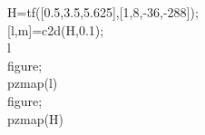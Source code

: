 \hspace{1mm}H=tf([0.5,3.5,5.625],[1,8,-36,-288]); \\ 
\hspace{1mm}[l,m]=c2d(H,0.1); \\ 
\hspace{1mm}l \\ 
\hspace{1mm}figure; \\ 
\hspace{1mm}pzmap(l) \\ 
\hspace{1mm}figure; \\ 
\hspace{1mm}pzmap(H) \\ 

